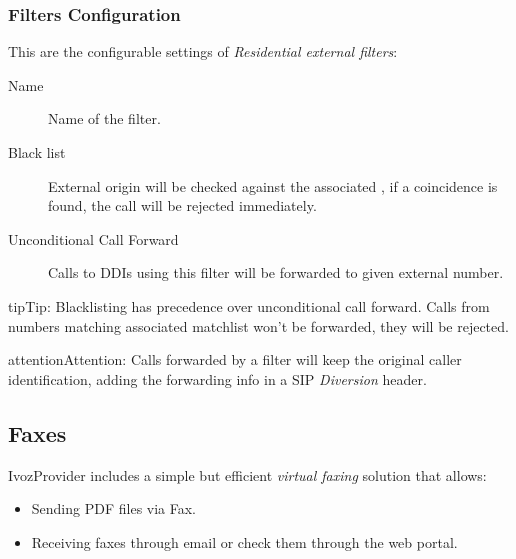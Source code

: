 \documentclass[letterpaper,10pt,english]{sphinxmanual}
\begin{document}
\subsubsection{Filters Configuration}
\label{administration_portal/client/residential/external_call_filters:filters-configuration}
This are the configurable settings of \emph{Residential external filters}:
\begin{description}
\item[{Name}] \leavevmode{}\label{administration_portal/client/residential/external_call_filters:term-name}
Name of the filter.

\item[{Black list}] \leavevmode{}\label{administration_portal/client/residential/external_call_filters:term-black-list}
External origin will be checked against the associated {\hyperref[administration_portal/client/vpbx/routing_tools/match_lists:match\string-lists]{}},
if a coincidence is found, the call will be rejected immediately.

\item[{Unconditional Call Forward}] \leavevmode{}\label{administration_portal/client/residential/external_call_filters:term-unconditional-call-forward}
Calls to DDIs using this filter will be forwarded to given external number.

\end{description}

\begin{notice}{tip}{Tip:}
Blacklisting has precedence over unconditional call forward. Calls from numbers
matching associated matchlist won't be forwarded, they will be rejected.
\end{notice}

\begin{notice}{attention}{Attention:}
Calls forwarded by a filter will keep the original
caller identification, adding the forwarding info in a SIP
\emph{Diversion} header.
\end{notice}


\subsection{Faxes}
\label{administration_portal/client/residential/faxes:faxes}\label{administration_portal/client/residential/faxes::doc}\label{administration_portal/client/residential/faxes:faxing-system}
IvozProvider includes a simple but efficient \emph{virtual faxing} solution that allows:
\begin{itemize}
\item {} 
Sending PDF files via Fax.

\item {} 
Receiving faxes through email or check them through the web portal.

\end{itemize}
\end{document}
